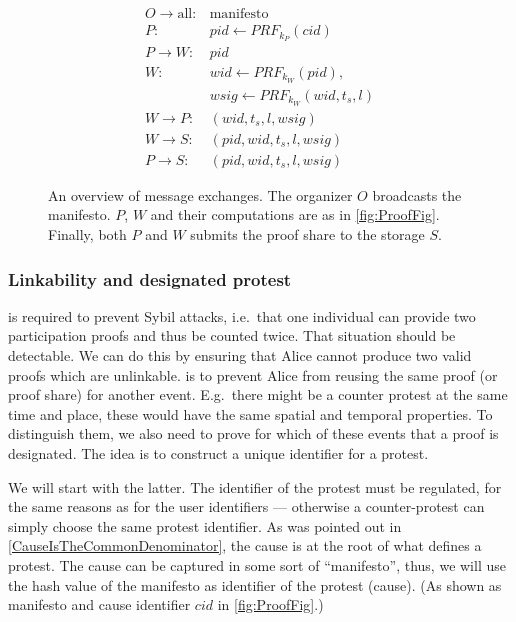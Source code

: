 \begin{frame}
\begin{figure}
  \centering
  \begin{minipage}{\linewidth}
    \begin{align*}
      O\to \text{all}\colon & \text{manifesto} \\
      P\colon & pid\gets PRF_{k_P}(cid) \\
      P\to W\colon & pid \\
      W\colon & wid\gets PRF_{k_W}(pid), \\
        & wsig\gets PRF_{k_W}(wid, t_s, l) \\
      W\to P\colon & (wid, t_s, l, wsig) \\
      W\to S\colon & (pid, wid, t_s, l, wsig) \\
      P\to S\colon & (pid, wid, t_s, l, wsig)
    \end{align*}
  \end{minipage}
  \caption{%
    An overview of message exchanges.
    The organizer \(O\) broadcasts the manifesto.
    \(P\), \(W\) and their computations are as in \cref{fig:ProofFig}.
    Finally, both \(P\) and \(W\) submits the proof share to the storage \(S\).
  }%
  \label{fig:ProtocolOverview}
\end{figure}
\end{frame}

\subsubsection{Linkability and designated protest}

 is required to prevent Sybil attacks, i.e.\ that one individual 
can provide two participation proofs and thus be counted twice.
That situation should be detectable.
We can do this by ensuring that Alice cannot produce two valid proofs which
are unlinkable.
 is to prevent Alice from reusing the same proof (or proof 
share) for another event.
E.g.\ there might be a counter protest at the same time and place, these would 
have the same spatial and temporal properties.
To distinguish them, we also need to prove for which of these events that a 
proof is designated.
The idea is to construct a unique identifier for a protest.

We will start with the latter.
The identifier of the protest must be regulated, for the same reasons as for the 
user identifiers --- otherwise a counter-protest can simply choose the same 
protest identifier.
As was pointed out in \cref{CauseIsTheCommonDenominator}, the cause is at the 
root of what defines a protest.
The cause can be captured in some sort of \enquote{manifesto}, thus, we will use 
the hash value of the manifesto as identifier of the protest (cause).
(As shown as manifesto and cause identifier \(cid\) in \cref{fig:ProofFig}.)

